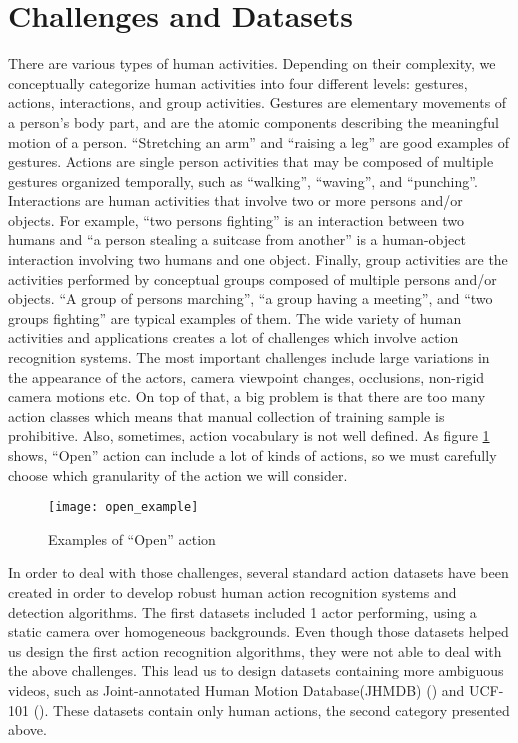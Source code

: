 \section{Challenges and Datasets}
There are various types of human activities. Depending on their complexity, we conceptually categorize human activities into four different
levels: gestures, actions, interactions, and group activities. Gestures are elementary movements of a person’s body part, and are the atomic
components describing the meaningful motion of a person. ``Stretching an arm'' and ``raising a leg'' are good examples of gestures.
Actions are single person activities that may be composed of multiple gestures organized temporally, such as ``walking'', ``waving'', and
``punching''. Interactions are human activities that involve two or more persons and/or objects. For example, ``two persons fighting'' is
an interaction between two humans and ``a person stealing a suitcase from another'' is a human-object interaction involving two humans and one
object. Finally, group activities are the activities performed by conceptual groups composed of multiple persons and/or objects. ``A group of persons marching'', ``a group having a meeting'', and ``two groups fighting'' are typical examples of them.
The wide variety of human activities and applications creates a lot of challenges which involve action recognition systems.
The most important challenges include large variations in the  appearance of the actors, camera viewpoint changes, occlusions,
non-rigid camera motions etc. On top of that, a big problem is that there are too many action classes which means
that manual collection of training sample is prohibitive. Also, sometimes, action vocabulary is not well defined.
As figure \ref{fig:open_example} shows, ``Open'' action can include a lot of kinds of actions, so we must carefully
choose which granularity of the action we will consider.

\begin{figure}[h]
  \centering
  \texttt{[image: open\_example]}
  \caption{Examples of ``Open'' action}
  \label{fig:open_example}

\end{figure}

In order to deal with those challenges, several standard action datasets have been created in order to develop
robust human action recognition systems and detection algorithms.
The first datasets included 1 actor performing, using a static camera over homogeneous backgrounds.
Even though those datasets helped us design the first action recognition algorithms, they were not able to deal with the above
challenges.
This lead us to design datasets containing more ambiguous videos, such as Joint-annotated Human Motion Database(JHMDB) (\cite{Kuehne11})
and UCF-101 (\cite{soomro2012ucf101}). These datasets contain only human actions, the second category presented above.


